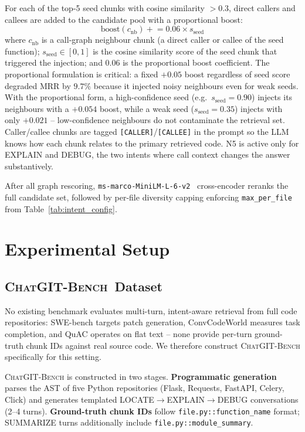 \documentclass[conference]{IEEEtran}
\newcommand{\conv}{\textsc{ChatGIT-Bench}\xspace}
\begin{document}
For each of the top-5 seed chunks with cosine similarity $>0.3$, direct
callers and callees are added to the candidate pool with a proportional boost:
\begin{equation}
\text{boost}(c_{\text{nb}}) \mathrel{+}= 0.06 \times s_{\text{seed}}
\end{equation}
where $c_{\text{nb}}$ is a call-graph neighbour chunk (a direct caller or
callee of the seed function); $s_{\text{seed}} \in [0,1]$ is the cosine
similarity score of the seed chunk that triggered the injection; and $0.06$
is the proportional boost coefficient. The proportional formulation is
critical: a fixed $+0.05$ boost regardless of seed score degraded MRR by
$9.7\%$ because it injected noisy neighbours even for weak seeds. With the
proportional form, a high-confidence seed (e.g.\ $s_{\text{seed}}{=}0.90$)
injects its neighbours with a $+0.054$ boost, while a weak seed
($s_{\text{seed}}{=}0.35$) injects with only $+0.021$ -- low-confidence
neighbours do not contaminate the retrieval set.
Caller/callee chunks are tagged \texttt{[CALLER]}/\texttt{[CALLEE]} in the
prompt so the LLM knows how each chunk relates to the primary retrieved code.
N5 is active only for EXPLAIN and DEBUG, the two intents where call context
changes the answer substantively.

After all graph rescoring, \texttt{ms-marco-MiniLM-L-6-v2}~\cite{reimers2019sentencebert}
cross-encoder reranks the full candidate set, followed by per-file diversity
capping enforcing \texttt{max\_per\_file} from Table~\ref{tab:intent_config}.

\FloatBarrier
\section{Experimental Setup}

\subsection{\conv\ Dataset}

No existing benchmark evaluates multi-turn, intent-aware retrieval from full code repositories: SWE-bench targets patch generation, ConvCodeWorld measures task completion, and QuAC operates on flat text -- none provide per-turn ground-truth chunk IDs against real source code. We therefore construct \conv specifically for this setting.

\conv is constructed in two stages. \textbf{Programmatic generation}
parses the AST of five Python repositories (Flask, Requests, FastAPI,
Celery, Click) and generates templated LOCATE$\to$EXPLAIN$\to$DEBUG
conversations (2--4 turns). \textbf{Ground-truth chunk IDs} follow
\texttt{file.py::function\_name} format; SUMMARIZE turns additionally
include \texttt{file.py::module\_summary}.
\end{document}
